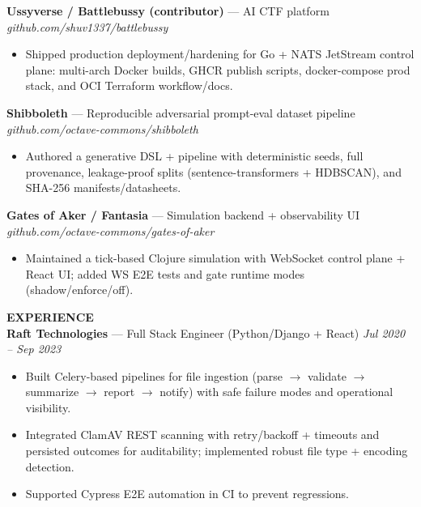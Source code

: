 \documentclass[10pt]{article}
\begin{document}
\textbf{Ussyverse / Battlebussy (contributor)} --- AI CTF platform \hfill \textit{github.com/shuv1337/battlebussy}\\
\vspace{-6pt}
\begin{itemize}
  \setlength\itemsep{-2pt}
  \setlength\parskip{0pt}
  \setlength\parsep{0pt}
  \item Shipped production deployment/hardening for Go + NATS JetStream control plane: multi-arch Docker builds, GHCR publish scripts, docker-compose prod stack, and OCI Terraform workflow/docs.
\end{itemize}

\textbf{Shibboleth} --- Reproducible adversarial prompt-eval dataset pipeline \hfill \textit{github.com/octave-commons/shibboleth}\\
\vspace{-6pt}
\begin{itemize}
  \setlength\itemsep{-2pt}
  \setlength\parskip{0pt}
  \setlength\parsep{0pt}
  \item Authored a generative DSL + pipeline with deterministic seeds, full provenance, leakage-proof splits (sentence-transformers + HDBSCAN), and SHA-256 manifests/datasheets.
\end{itemize}

\textbf{Gates of Aker / Fantasia} --- Simulation backend + observability UI \hfill \textit{github.com/octave-commons/gates-of-aker}\\
\vspace{-6pt}
\begin{itemize}
  \setlength\itemsep{-2pt}
  \setlength\parskip{0pt}
  \setlength\parsep{0pt}
  \item Maintained a tick-based Clojure simulation with WebSocket control plane + React UI; added WS E2E tests and gate runtime modes (shadow/enforce/off).
\end{itemize}

\vspace{4pt}
\textbf{EXPERIENCE}\\

\textbf{Raft Technologies} --- Full Stack Engineer (Python/Django + React) \hfill \textit{Jul 2020 -- Sep 2023}\\
\vspace{-6pt}
\begin{itemize}
  \setlength\itemsep{-2pt}
  \setlength\parskip{0pt}
  \setlength\parsep{0pt}
  \item Built Celery-based pipelines for file ingestion (parse $\rightarrow$ validate $\rightarrow$ summarize $\rightarrow$ report $\rightarrow$ notify) with safe failure modes and operational visibility.
  \item Integrated ClamAV REST scanning with retry/backoff + timeouts and persisted outcomes for auditability; implemented robust file type + encoding detection.
  \item Supported Cypress E2E automation in CI to prevent regressions.
\end{itemize}
\end{document}
